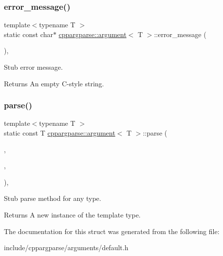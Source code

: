 \subsubsection{\texorpdfstring{error\+\_\+message()}{error\_message()}}
{\footnotesize\ttfamily template$<$typename T $>$ \\
static const char$\ast$ \hyperlink{structcppargparse_1_1argument}{cppargparse\+::argument}$<$ T $>$\+::error\+\_\+message (\begin{DoxyParamCaption}\item[{const types\+::\+Command\+Line\+Argument\+\_\+t \&}]{ }\end{DoxyParamCaption})\hspace{0.3cm}{\ttfamily [inline]}, {\ttfamily [static]}}



Stub error message. 

\begin{DoxyReturn}{Returns}
An empty C-\/style string. 
\end{DoxyReturn}
\mbox{\label{structcppargparse_1_1argument_a45846753c88bdff65453703bb481ec61}} 
\subsubsection{\texorpdfstring{parse()}{parse()}}
{\footnotesize\ttfamily template$<$typename T $>$ \\
static const T \hyperlink{structcppargparse_1_1argument}{cppargparse\+::argument}$<$ T $>$\+::parse (\begin{DoxyParamCaption}\item[{const types\+::\+Command\+Line\+\_\+t \&}]{,  }\item[{const types\+::\+Command\+Line\+Argument\+\_\+t \&}]{,  }\item[{const types\+::\+Command\+Line\+Arguments\+Map\+\_\+t \&}]{ }\end{DoxyParamCaption})\hspace{0.3cm}{\ttfamily [inline]}, {\ttfamily [static]}}



Stub parse method for any type. 

\begin{DoxyReturn}{Returns}
A new instance of the template type. 
\end{DoxyReturn}


The documentation for this struct was generated from the following file\+:\begin{DoxyCompactItemize}
\item 
include/cppargparse/arguments/default.\+h\end{DoxyCompactItemize}

